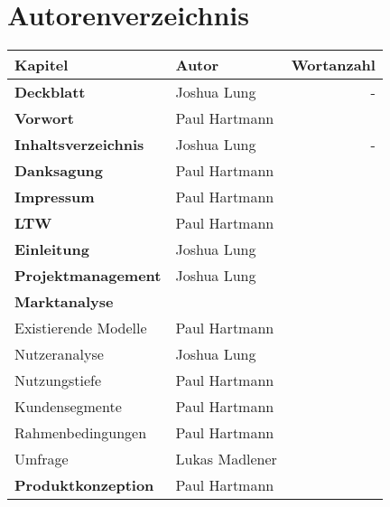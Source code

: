 \section{Autorenverzeichnis}

\begin{table}[!h]
  \centering
  \begin{tabular}{l|l|r}
    \textbf{Kapitel}                       & \textbf{Autor} & \textbf{Wortanzahl} \\ \hline\hline
    \textbf{Deckblatt}                     & Joshua Lung    & -                   \\ \hline
    \textbf{Vorwort}                       & Paul Hartmann  &                     \\ \hline
    \textbf{Inhaltsverzeichnis}            & Joshua Lung    & -                   \\ \hline
    \textbf{Danksagung}                    & Paul Hartmann  &                     \\ \hline
    \textbf{Impressum}                     & Paul Hartmann  &                     \\ \hline
    \textbf{LTW}                           & Paul Hartmann  &                     \\ \hline
    \textbf{Einleitung}                    & Joshua Lung    &                     \\ \hline
    \textbf{Projektmanagement}             & Joshua Lung    &                     \\ \hline
    \textbf{Marktanalyse}                  &                &                     \\ \hline
    Existierende Modelle                   & Paul Hartmann  &                     \\ \hline
    Nutzeranalyse                          & Joshua Lung    &                     \\ \hline
    Nutzungstiefe                          & Paul Hartmann  &                     \\ \hline
    Kundensegmente                         & Paul Hartmann  &                     \\ \hline
    Rahmenbedingungen                      & Paul Hartmann  &                     \\ \hline
    Umfrage                                & Lukas Madlener &                     \\ \hline
    \textbf{Produktkonzeption}             & Paul Hartmann  &                     \\

\end{tabular}
\end{table}
